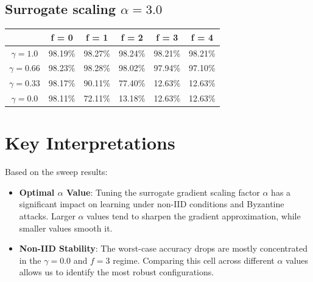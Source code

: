 \documentclass{article}
\begin{document}
\subsection{Surrogate scaling $\alpha = 3.0$}
\begin{table}[htbp]
    \centering
    \begin{tabular}{cccccc}
        \toprule
        & \textbf{f = 0} & \textbf{f = 1} & \textbf{f = 2} & \textbf{f = 3} & \textbf{f = 4} \\
        \midrule
        $\gamma = 1.0$ & 98.19\% & 98.27\% & 98.24\% & 98.21\% & 98.21\% \\
        $\gamma = 0.66$ & 98.23\% & 98.28\% & 98.02\% & 97.94\% & 97.10\% \\
        $\gamma = 0.33$ & 98.17\% & 90.11\% & 77.40\% & 12.63\% & 12.63\% \\
        $\gamma = 0.0$ & 98.11\% & 72.11\% & 13.18\% & 12.63\% & 12.63\% \\
        \bottomrule
    \end{tabular}
\end{table}

\section{Key Interpretations}
Based on the sweep results:
\begin{itemize}
    \item \textbf{Optimal $\alpha$ Value}: Tuning the surrogate gradient scaling factor $\alpha$ has a significant impact on learning under non-IID conditions and Byzantine attacks. Larger $\alpha$ values tend to sharpen the gradient approximation, while smaller values smooth it.
    \item \textbf{Non-IID Stability}: The worst-case accuracy drops are mostly concentrated in the $\gamma = 0.0$ and $f = 3$ regime. Comparing this cell across different $\alpha$ values allows us to identify the most robust configurations.
\end{itemize}
\end{document}
